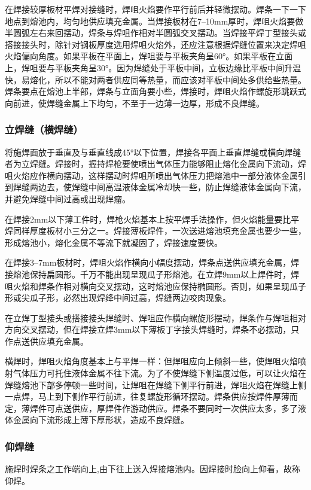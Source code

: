 \documentclass{ctexbook}
\begin{document}
在焊接较厚板材平焊对接缝时，焊咀火焰要作平行前后并轻微摆动。焊条一下一下地点到熔池内，均匀地供应填充金属。当焊接板材在7--10mm厚时，焊咀火焰要做半圆弧左右来回摆动，焊条与焊咀作相对半圆弧交叉摆动。当焊接平焊丁型接头或搭接接头时，除针对钢板厚度选用焊咀火焰外，还应注意根据焊缝位置来决定焊咀火焰偏向角度。如果平板在平面上，焊咀要与平板夹角呈60°。如果平板在立面上，焊咀要与平板夹角呈30°。因为焊缝处于平板中间，立板边缘比平板中间升温快，易熔化，所以不能对两者供应同等热量，而应该对平板中间处多供给些热量。焊条要点在熔池上半部，焊条与立面角要小些，焊接时，焊咀火焰作螺旋形跳跃式向前进，使焊缝金属上下均匀，不至于一边薄一边厚，形成不良焊缝。
\subsubsection{立焊缝（横焊缝）}
将施焊面放于垂直及与垂直线成45°以下位置，焊接各平面上垂直焊缝或横向焊缝者为立焊缝。焊接时，握持焊枪要使喷出气体压力能够阻止熔化金属向下流动，焊咀火焰应作横向摆动，这样摆动时焊咀所喷出气体压力把熔池中一部分液体金属引到焊缝两边去，使焊缝中间高温液体金属冷却快一些，防止焊缝液体金属向下流，并避免焊缝中间过高或出现焊瘤。

在焊接2mm以下薄工件时，焊枪火焰基本上按平焊手法操作，但火焰能量要比平焊同样厚度板材小三分之一。焊接薄板焊件，一次送进熔池填充金属也要少一些，形成熔池小，熔化金属不等流下就凝固了，焊接速度要快。

在焊接3--7mm板材时，焊咀火焰作横向小幅度摆动，焊条点送供应填充金属，焊接熔池保持扁圆形。千万不能出现呈现瓜子形熔池。在立焊9mm以上焊件时，焊咀火焰和焊条作相对横向交叉摆动，这时熔池应保持椭圆形。否则，如果呈现瓜子形或尖瓜子形，必然出现焊绛中间过高，焊缝两边咬肉现象。

在立焊丁型接头或搭接接头焊缝时、焊咀应作横向螺旋形摆动，焊条作与焊咀相对方向交叉摆动，但在焊接立焊3mm以下薄板丁字接头焊缝时，焊条不必摆动，只作点送供应填充金属。

横焊时，焊咀火焰角度基本上与平焊一样：但焊咀应向上倾斜一些，使焊咀火焰喷射气体压力可托住液体金属不往下流。为了不使焊缝下侧温度过低，可以让火焰在焊缝熔池下部多停顿一些时间，让焊咀在焊缝下侧平行前进，焊咀火焰在焊缝上侧一点焊，马上到下侧作平行前进，往复螺旋形循环摆动。焊条供应按焊件厚薄而定，薄焊件可点送供应，厚焊件作游动供应。焊条不要同时一次供应太多，多了液体金属向下流形成上薄下厚形状，造成不良焊缝。
\subsubsection{仰焊缝}
施焊时焊条之工作端向上,由下往上送入焊接熔池内。因焊接时脸向上仰看，故称仰焊。
\end{document}

